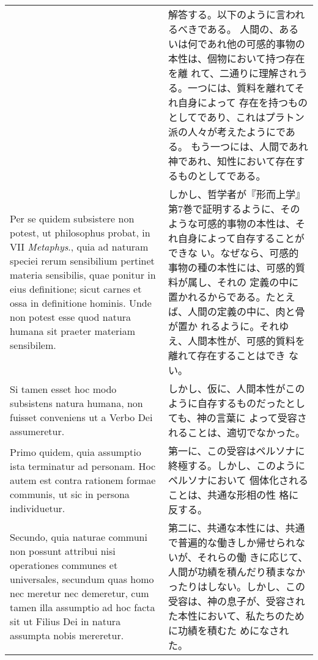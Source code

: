 \documentclass[10pt]{jsarticle} %
\begin{document}
\begin{longtable}{p{21em}p{21em}}
&

解答する。以下のように言われるべきである。
人間の、あるいは何であれ他の可感的事物の本性は、個物において持つ存在を離
 れて、二通りに理解されうる。一つには、質料を離れてそれ自身によって
 存在を持つものとしてであり、これはプラトン派の人々が考えたようにである。
 もう一つには、人間であれ神であれ、知性において存在するものとしてである。

\\

Per se quidem subsistere non potest, ut philosophus
probat, in VII {\itshape Metaphys}., quia ad naturam speciei rerum sensibilium
pertinet materia sensibilis, quae ponitur in eius definitione; sicut
carnes et ossa in definitione hominis. 
Unde non potest esse quod natura
humana sit praeter materiam sensibilem.
&

しかし、哲学者が『形而上学』第7巻で証明するように、そのような可感的事物の本性は、それ自身によって自存することができな
 い。なぜなら、可感的事物の種の本性には、可感的質料が属し、それの
 定義の中に置かれるからである。たとえば、人間の定義の中に、肉と骨が置か
 れるように。それゆえ、人間本性が、可感的質料を離れて存在することはでき
 ない。

\\

 Si tamen esset hoc modo
subsistens natura humana, non fuisset conveniens ut a Verbo Dei
assumeretur. 


&

しかし、仮に、人間本性がこのように自存するものだったとしても、神の言葉に
 よって受容されることは、適切でなかった。

\\

Primo quidem, quia assumptio ista terminatur ad
personam. Hoc autem est contra rationem formae communis, ut sic in
persona individuetur. 


&

第一に、この受容はペルソナに終極する。しかし、このようにペルソナにおいて
 個体化されることは、共通な形相の性
 格に反する。


\\

Secundo, quia naturae communi non possunt attribui
nisi operationes communes et universales, secundum quas homo nec meretur
nec demeretur, cum tamen illa assumptio ad hoc facta sit ut Filius Dei
in natura assumpta nobis mereretur. 

&

第二に、共通な本性には、共通で普遍的な働きしか帰せられないが、それらの働
 きに応じて、人間が功績を積んだり積まなかったりはしない。しかし、この
 受容は、神の息子が、受容された本性において、私たちのために功績を積むた
 めになされた。



\end{longtable}
\end{document}
